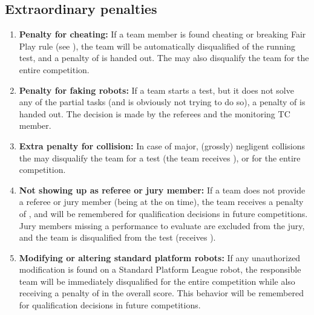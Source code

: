 \subsection{Extraordinary penalties}\label{rule:extraordinary_penalties}
\begin{enumerate}
	\item \textbf{Penalty for cheating:} If a team member is found cheating or breaking Fair Play rule (see ), the team will be automatically disqualified of the running test, and a penalty of  is handed out.
	The  may also disqualify the team for the entire competition.

	\item \textbf{Penalty for faking robots:} If a team starts a test, but it does not solve any of the partial tasks (and is obviously not trying to do so), a penalty of  is handed out.
	The decision is made by the referees and the monitoring TC member.

	\item \textbf{Extra penalty for collision:} In case of major, (grossly) negligent collisions the  may disqualify the team for a test (the team receives ), or for the entire competition.

	\item \textbf{Not showing up as referee or jury member:} If a team does not provide a referee or jury member (being at the \Arena{} on time), the team receives a penalty of , and will be remembered for qualification decisions in future competitions.\\
	Jury members missing a performance to evaluate are excluded from the jury, and the team is disqualified from the test (receives ).

	\item \textbf{Modifying or altering standard platform robots:} If any unauthorized modification is found on a Standard Platform League robot, the responsible team will be immediately disqualified for the entire competition while also receiving a penalty of  in the overall score. This behavior will be remembered for qualification decisions in future competitions.\\
\end{enumerate}

